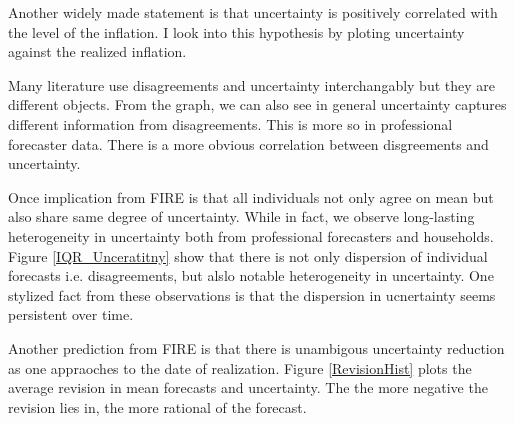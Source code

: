 \documentclass[]{article}
\begin{document}
Another widely made statement is that uncertainty is positively correlated with the level of the inflation. I look into this hypothesis by ploting uncertainty against the realized inflation.  
 
Many literature use disagreements and uncertainty interchangably but they are different objects. From the graph, we can also see in general uncertainty captures different information from disagreements. This is more so in professional forecaster data. There is a more obvious correlation between disgreements and uncertainty. 

Once implication from FIRE is that all individuals not only agree on mean but also share same degree of uncertainty. While in fact, we observe long-lasting heterogeneity in uncertainty both from professional forecasters and households. Figure \ref{IQR_Unceratitny} show that there is  not only dispersion of individual forecasts i.e. disagreements, but alslo notable heterogeneity in uncertainty. One stylized fact from these observations is that  the dispersion in ucnertainty seems persistent over time.  
 

Another prediction from FIRE is that there is unambigous uncertainty reduction as one appraoches to the date of realization. Figure \ref{RevisionHist} plots the average revision in mean forecasts and uncertainty. The the more negative the revision lies in, the more rational of the forecast.  
\end{document}
